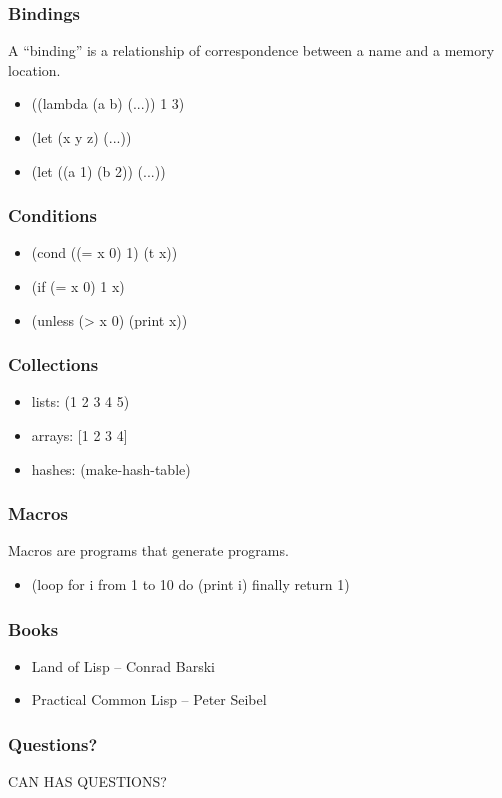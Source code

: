 \documentclass[16pt]{beamer}
\begin{document}
\begin{frame}
  \frametitle{Bindings}
  \begin{block}{}
  A ``binding'' is a relationship of
  correspondence between a name and a memory location.
  \end{block}
  \begin{itemize}
  \item ((lambda (a b) (...)) 1 3)
  \item (let (x y z) (...))
  \item (let ((a 1) (b 2)) (...))
  \end{itemize}
\end{frame}

\begin{frame}
  \frametitle{Conditions}
  \begin{itemize}
  \item (cond ((= x 0) 1) (t x))
  \item (if (= x 0) 1 x)
  \item (unless (> x 0) (print x))
  \end{itemize}
\end{frame}

\begin{frame}
  \frametitle{Collections}
  \begin{itemize}
  \item lists: (1 2 3 4 5)
  \item arrays: [1 2 3 4]
  \item hashes: (make-hash-table)
  \end{itemize}
\end{frame}

\begin{frame}
  \frametitle{Macros}
  \begin{block}{}
  Macros are programs that generate programs.
  \end{block}
  \begin{itemize}
  \item (loop for i from 1 to 10 do (print i) finally return 1)
  \end{itemize}
\end{frame}

\begin{frame}
  \frametitle{Books}
  \begin{itemize}
  \item Land of Lisp -- Conrad Barski
  \item Practical Common Lisp -- Peter Seibel
  \end{itemize}
\end{frame}

\begin{frame}
  \frametitle{Questions?}
  \begin{center}
  CAN HAS QUESTIONS?
  \end{center}
\end{frame}
\end{document}
